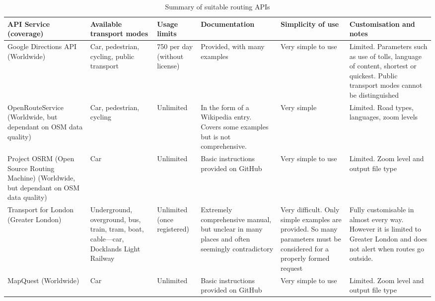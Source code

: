 \begin{landscape}
\begin{table}
    \hspace*{-.1cm}%
    \begin{tabular}{@{}| R{3.3cm} | R{3.2cm} | R{1.9cm} | R{3.2cm} | R{3.4cm} | R{4.5cm} |@{}}

    \hline

\textbf{API Service (coverage)} & \textbf{Available transport modes} & \textbf{Usage limits} & \textbf{Documentation} & \textbf{Simplicity of use} & \textbf{Customisation and notes} \\ \hline

Google Directions API (Worldwide) & Car, pedestrian, cycling, public transport & 750 per day (without license) & Provided, with many examples & Very simple to use & Limited. Parameters such as use of tolls, language of content, shortest or quickest. Public transport modes cannot be distinguished \\ \hline

OpenRouteService (Worldwide, but dependant on OSM data quality) & Car, pedestrian, cycling & Unlimited & In the form of a Wikipedia entry. Covers some examples but is not comprehensive. & Very simple & Limited. Road types, languages, zoom levels \\ \hline

Project OSRM (Open Source Routing Machine) (Worldwide, but dependant on OSM data quality) & Car & Unlimited & Basic instructions provided on GitHub & Very simple to use & Limited. Zoom level and output file type \\ \hline

Transport for London (Greater London) & Underground, overground, bus, train, tram, boat, cable---car, Docklands Light Railway & Unlimited (once registered) & Extremely comprehensive manual, but unclear in many places and often seemingly contradictory & Very difficult. Only simple examples are provided. So many parameters must be considered for a properly formed request & Fully customisable in almost every way. However it is limited to Greater London and does not alert when routes go outside. \\ \hline

MapQuest (Worldwide) & Car & Unlimited & Basic instructions provided on GitHub & Very simple to use & Limited. Zoom level and output file type \\ \hline

\end{tabular}\hspace*{-2cm}%
\caption{Summary of suitable routing APIs}
\label{tab:api_summary_table}
\vspace{-1cm}%
\end{table}
\end{landscape}

